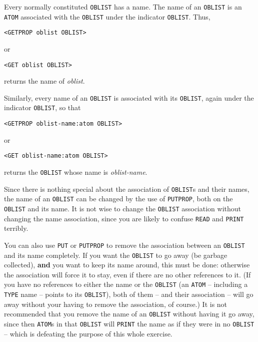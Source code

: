 \documentclass[a4paper,]{article}
\begin{document}
 Every normally constituted \texttt{OBLIST} has a name. The name of an \texttt{OBLIST} is an
\texttt{ATOM} associated with the \texttt{OBLIST} under the indicator \texttt{OBLIST}. Thus,

\begin{verbatim}
<GETPROP oblist OBLIST>
\end{verbatim}

or

\begin{verbatim}
<GET oblist OBLIST>
\end{verbatim}

returns the name of \emph{oblist}.

Similarly, every name of an \texttt{OBLIST} is associated with its \texttt{OBLIST}, again under the indicator
\texttt{OBLIST}, so that

\begin{verbatim}
<GETPROP oblist-name:atom OBLIST>
\end{verbatim}

or

\begin{verbatim}
<GET oblist-name:atom OBLIST>
\end{verbatim}

returns the \texttt{OBLIST} whose name is \emph{oblist-name}.

Since there is nothing special about the association of \texttt{OBLIST}s and their names, the name of an \texttt{OBLIST}
can be changed by the use of \texttt{PUTPROP}, both on the \texttt{OBLIST} and its name. It is not wise to change the
\texttt{OBLIST} association without changing the name association, since you are likely to confuse \texttt{READ} and
\texttt{PRINT} terribly.

You can also use \texttt{PUT} or \texttt{PUTPROP} to remove the association between an \texttt{OBLIST} and its name
completely. If you want the \texttt{OBLIST} to go away (be garbage collected), \textbf{and} you want to keep its name
around, this must be done: otherwise the association will force it to stay, even if there are no other references to it.
(If you have no references to either the name or the \texttt{OBLIST} (an \texttt{ATOM} -- including a \texttt{TYPE} name --
points to its \texttt{OBLIST}), both of them -- and their association -- will go away without your having to remove the
association, of course.) It is not recommended that you remove the name of an \texttt{OBLIST} without having it go away,
since then \texttt{ATOM}s in that \texttt{OBLIST} will \texttt{PRINT} the name as if they were in no \texttt{OBLIST} --
which is defeating the purpose of this whole exercise.
\end{document}
